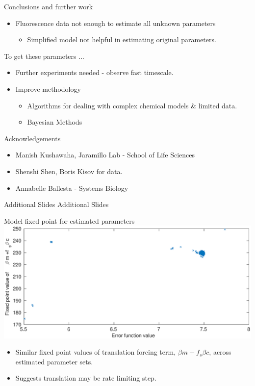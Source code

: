\documentclass{beamer}
\begin{document}
\begin{frame}{Conclusions and further work}
  \begin{itemize}
  \item Fluorescence data \alert {not enough} to estimate all unknown parameters 
  \begin{itemize}
  \item Simplified model not helpful in estimating original parameters.
  \end{itemize}
  \end{itemize}
To get these parameters ...
  \begin{itemize}
  \item Further experiments needed - observe fast timescale.
  \item Improve methodology
    \begin{itemize}
    \item Algorithms for dealing with complex chemical models \& limited data.
    \item Bayesian Methods
      \end{itemize}
  \end{itemize}
  \end{frame}
  
  \begin{frame}{Acknowledgements}
  \begin{itemize}
  \item Manish Kushawaha, Jaramillo Lab - School of Life Sciences
  \item Shenshi Shen, Boris Kisov for data.
  \item Annabelle Ballesta - Systems Biology
  \end{itemize}
  \end{frame}
    
  \begin{frame}{Additional Slides}
  \Huge
	Additional Slides
	\normalsize
  \end{frame}
  
  
\begin{frame}{Model fixed point for estimated parameters}
  \includegraphics[scale = 0.24, clip = true, trim = 0 0 0 0]{../Figures/fixedpoint_f}
\begin{itemize}
	\item Similar fixed point values of translation forcing term, ${\beta} m +{f_{s}}\beta c$, across estimated parameter sets.
	\item Suggests translation may be rate limiting step.
\end{itemize}
\end{frame}
\end{document}

